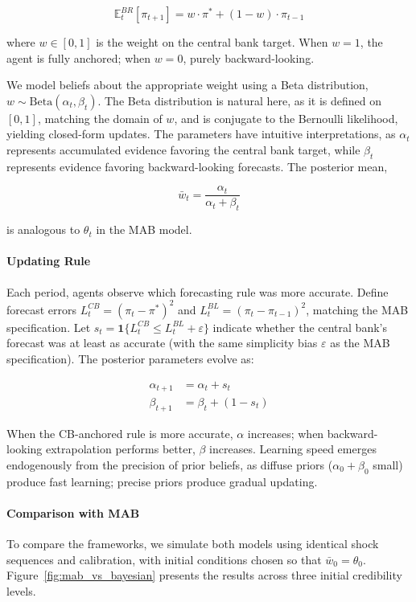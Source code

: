 \documentclass[10pt]{article}
\begin{document}
\begin{equation}
\mathbb{E}^{BR}_t[\pi_{t+1}] = w \cdot \pi^* + (1-w) \cdot \pi_{t-1}
\end{equation}

where $w \in [0,1]$ is the weight on the central bank target. When $w = 1$, the agent is fully anchored; when $w = 0$, purely backward-looking.

We model beliefs about the appropriate weight using a Beta distribution, $w \sim \text{Beta}(\alpha_t, \beta_t)$. The Beta distribution is natural here, as it is defined on $[0,1]$, matching the domain of $w$, and is conjugate to the Bernoulli likelihood, yielding closed-form updates. The parameters have intuitive interpretations, as $\alpha_t$ represents accumulated evidence favoring the central bank target, while $\beta_t$ represents evidence favoring backward-looking forecasts. The posterior mean,
  
\begin{equation}
\bar{w}_t = \frac{\alpha_t}{\alpha_t + \beta_t}
\end{equation}

is analogous to $\theta_t$ in the MAB model.

\paragraph{Updating Rule} Each period, agents observe which forecasting rule was more accurate. Define forecast errors $L^{CB}_t = (\pi_t - \pi^*)^2$ and $L^{BL}_t = (\pi_t - \pi_{t-1})^2$, matching the MAB specification. Let $s_t = \mathbf{1}\{L^{CB}_t \leq L^{BL}_t + \varepsilon\}$ indicate whether the central bank's forecast was at least as accurate (with the same simplicity bias $\varepsilon$ as the MAB specification). The posterior parameters evolve as:

\begin{align}
\alpha_{t+1} &= \alpha_t + s_t \\
\beta_{t+1} &= \beta_t + (1 - s_t)
\end{align}

When the CB-anchored rule is more accurate, $\alpha$ increases; when backward-looking extrapolation performs better, $\beta$ increases. Learning speed emerges endogenously from the precision of prior beliefs, as diffuse priors ($\alpha_0 + \beta_0$ small) produce fast learning; precise priors produce gradual updating.

\paragraph{Comparison with MAB} To compare the frameworks, we simulate both models using identical shock sequences and calibration, with initial conditions chosen so that $\bar{w}_0 = \theta_0$. Figure~\ref{fig:mab_vs_bayesian} presents the results across three initial credibility levels.
\end{document}
